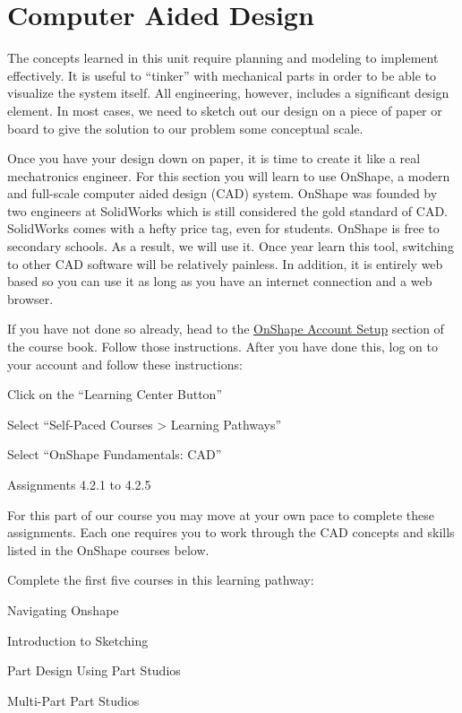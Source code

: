 \documentclass[
]{book}
\begin{document}
\hypertarget{computer-aided-design}{%
\section{Computer Aided Design}\label{computer-aided-design}}

The concepts learned in this unit require planning and modeling to implement effectively. It is useful to ``tinker'' with mechanical parts in order to be able to visualize the system itself. All engineering, however, includes a significant design element. In most cases, we need to sketch out our design on a piece of paper or board to give the solution to our problem some conceptual scale.

Once you have your design down on paper, it is time to create it like a real mechatronics engineer. For this section you will learn to use OnShape, a modern and full-scale computer aided design (CAD) system. OnShape was founded by two engineers at SolidWorks which is still considered the gold standard of CAD. SolidWorks comes with a hefty price tag, even for students. OnShape is free to secondary schools. As a result, we will use it. Once year learn this tool, switching to other CAD software will be relatively painless. In addition, it is entirely web based so you can use it as long as you have an internet connection and a web browser.

If you have not done so already, head to the \protect\hyperlink{onshape-account-setup}{OnShape Account Setup} section of the course book. Follow those instructions. After you have done this, log on to your account and follow these instructions:

Click on the ``Learning Center Button''

Select ``Self-Paced Courses \textgreater{} Learning Pathways''

Select ``OnShape Fundamentals: CAD''

Assignments 4.2.1 to 4.2.5

For this part of our course you may move at your own pace to complete these assignments. Each one requires you to work through the CAD concepts and skills listed in the OnShape courses below.

Complete the first five courses in this learning pathway:

Navigating Onshape

Introduction to Sketching

Part Design Using Part Studios

Multi-Part Part Studios
\end{document}
